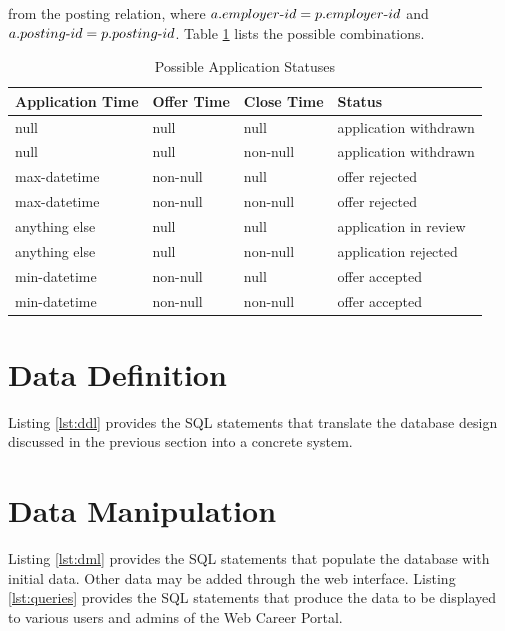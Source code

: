 \documentclass{article}
\newcommand{\tdash}{\textnormal{-}}
\begin{document}
            from the posting relation, where $a.employer \tdash id = p.employer \tdash id$ and $a.posting \tdash id =
            p.posting \tdash id$. Table \ref{tab:app_status} lists the possible combinations.
            \begin{table}[h]
                \centering
                \begin{tabular}{|l|l|l|l|}
                    \hline
                    \textbf{Application Time} & \textbf{Offer Time} & \textbf{Close Time} & \textbf{Status}       \\ \hline
                    null                      & null                & null                & application withdrawn \\ \hline
                    null                      & null                & non-null            & application withdrawn \\ \hline
                    max-datetime              & non-null            & null                & offer rejected        \\ \hline
                    max-datetime              & non-null            & non-null            & offer rejected        \\ \hline
                    anything else             & null                & null                & application in review \\ \hline
                    anything else             & null                & non-null            & application rejected  \\ \hline
                    min-datetime              & non-null            & null                & offer accepted        \\ \hline
                    min-datetime              & non-null            & non-null            & offer accepted        \\ \hline
                \end{tabular}
                \caption{Possible Application Statuses}
                \label{tab:app_status}
            \end{table}
    \section{Data Definition}
        Listing \ref{lst:ddl} provides the SQL statements that translate the database design discussed in the previous
        section into a concrete system. 
    \section{Data Manipulation}
        Listing \ref{lst:dml} provides the SQL statements that populate the database with initial data. Other data may
        be added through the web interface.  Listing \ref{lst:queries} provides the SQL statements that produce the data
        to be displayed to various users and admins of the Web Career Portal. 
\end{document}
